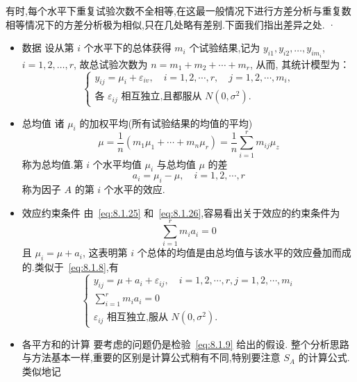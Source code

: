 有时,每个水平下重复试验次数不全相等,在这最一般情况下进行方差分析与重复数相等情况下的方差分析极为相似,只在几处略有差别.下面我们指出差异之处.
·
\begin{itemize}
  \item 数据
  设从第 $i$ 个水平下的总体获得 $m_i$ 个试验结果,记为 $y_{i1}, y_{i2}, \ldots, y_{im_{i}}$, $i=1,2,\ldots,r$, 故总试验次数为 $n=m_1+m_2+\cdots+m_r$, 从而, 其统计模型为：
  \begin{equation}\label{eq:8.1.24}
    \begin{cases}
      y_{i j}=\mu_{i}+\varepsilon_{i v}, \quad i=1,2, \cdots, r, \quad j=1,2, \cdots, m_{i},\\
      \text{各 $\varepsilon_{ij}$ 相互独立,且都服从 $N(0,\sigma^2)$}.
    \end{cases}
  \end{equation}
  \item 总均值
  诸 $\mu_i$ 的加权平均(所有试验结果的均值的平均)
  \begin{equation}\label{eq:8.1.25}
    \mu=\frac{1}{n}\left(m_{1} \mu_{1}+\cdots+m_{n} \mu_{r}\right)=\frac{1}{n} \sum_{i=1}^{r} m_{i j} \mu_{z}
  \end{equation}
  称为总均值.第 $i$ 个水平均值 $\mu_i$ 与总均值 $\mu$ 的差
  \begin{equation}\label{eq:8.1.26}
    a_{i}=\mu_{i}-\mu, \quad i=1,2, \cdots, r
  \end{equation}
  称为因子 $A$ 的第 $i$ 个水平的效应.
  \item 效应约束条件
  由~\eqref{eq:8.1.25} 和~\eqref{eq:8.1.26},容易看出关于效应的约束条件为
  \begin{equation*}
    \sum_{i=1}^{r} m_{i} a_{i}=0
  \end{equation*}
  且 $\mu_i = \mu + a_i$, 这表明第 $i$ 个总体的均值是由总均值与该水平的效应叠加而成的.类似于~\eqref{eq:8.1.8},有
  \begin{equation}\label{eq:8.1.27}
    \begin{cases}
      y_{i j}=\mu+a_{i}+\varepsilon_{i j}, \quad i=1,2, \cdots, r, j=1,2, \cdots, m_{i}\\
      \sum_{i=1}^{r} m_{i} a_{i}=0\\
      \text{$\varepsilon_{ij}$ 相互独立,服从 $N(0,\sigma^2)$}.
    \end{cases}
  \end{equation}
  \item 各平方和的计算
  要考虑的问题仍是检验~\eqref{eq:8.1.9} 给出的假设. 整个分析思路与方法基本一样,重要的区别是计算公式稍有不同,特别要注意 $S_A$ 的计算公式. 类似地记

\end{itemize}
